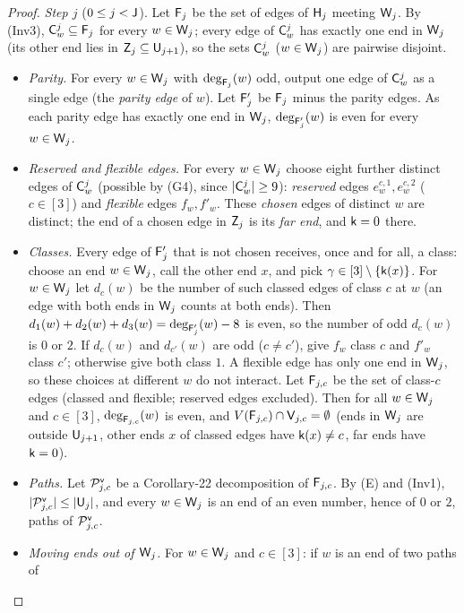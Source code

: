 \begin{proof}
\emph{Step $j$} ($0\le j<\mathsf{J}$). Let $\mathsf{F}_j$ be the set of edges of $\mathsf{H}_j$ meeting $\mathsf{W}_j$. By (Inv3),
$\mathsf{C}^j_w\subseteq\mathsf{F}_j$ for every $w\in\mathsf{W}_j$; every edge of $\mathsf{C}^j_w$ has exactly one end in $\mathsf{W}_j$ (its other end
lies in $\mathsf{Z}_j\subseteq\mathsf{U}_{j+1}$), so the sets $\mathsf{C}^j_w$ ($w\in\mathsf{W}_j$) are pairwise disjoint.
\begin{itemize}
\item[(a)] \emph{Parity.} For every $w\in\mathsf{W}_j$ with $\deg_{\mathsf{F}_j}(w)$ odd, output one edge of $\mathsf{C}^j_w$ as a single
  edge (the \emph{parity edge} of $w$). Let $\mathsf{F}'_j$ be $\mathsf{F}_j$ minus the parity edges. As each parity edge has
  exactly one end in $\mathsf{W}_j$, $\deg_{\mathsf{F}'_j}(w)$ is even for every $w\in\mathsf{W}_j$.
\item[(b)] \emph{Reserved and flexible edges.} For every $w\in\mathsf{W}_j$ choose eight further distinct edges of
  $\mathsf{C}^j_w$ (possible by (G4), since $|\mathsf{C}^j_w|\ge9$): \emph{reserved} edges $e^{c,1}_w,e^{c,2}_w$ ($c\in[3]$) and
  \emph{flexible} edges $f_w,f'_w$. These \emph{chosen} edges of distinct $w$ are distinct; the end of a chosen edge
  in $\mathsf{Z}_j$ is its \emph{far end}, and $\mathsf{k}=0$ there.
\item[(c)] \emph{Classes.} Every edge of $\mathsf{F}'_j$ that is not chosen receives, once and for all, a class: choose an
  end $w\in\mathsf{W}_j$, call the other end $x$, and pick $\gamma\in[3]\setminus\{\mathsf{k}(x)\}$. For $w\in\mathsf{W}_j$ let
  $d_c(w)$ be the number of such classed edges of class $c$ at $w$ (an edge with both ends in $\mathsf{W}_j$ counts at both
  ends). Then $d_1(w)+d_2(w)+d_3(w)=\deg_{\mathsf{F}'_j}(w)-8$ is even, so the number of odd $d_c(w)$ is $0$ or $2$. If
  $d_c(w)$ and $d_{c'}(w)$ are odd ($c\ne c'$), give $f_w$ class $c$ and $f'_w$ class $c'$; otherwise give both
  class $1$. A flexible edge has only one end in $\mathsf{W}_j$, so these choices at different $w$ do not interact. Let
  $\mathsf{F}_{j,c}$ be the set of class-$c$ edges (classed and flexible; reserved edges excluded). Then for all
  $w\in\mathsf{W}_j$ and $c\in[3]$, $\deg_{\mathsf{F}_{j,c}}(w)$ is even, and $V(\mathsf{F}_{j,c})\cap\mathsf{V}_{j,c}=\emptyset$ (ends in
  $\mathsf{W}_j$ are outside $\mathsf{U}_{j+1}$, other ends $x$ of classed edges have $\mathsf{k}(x)\ne c$, far ends have $\mathsf{k}=0$).
\item[(d)] \emph{Paths.} Let $\mathcal{P}^{\mathsf{v}}_{j,c}$ be a Corollary-22 decomposition of $\mathsf{F}_{j,c}$. By \textup{(E)} and
  (Inv1), $|\mathcal{P}^{\mathsf{v}}_{j,c}|\le|\mathsf{U}_j|$, and every $w\in\mathsf{W}_j$ is an end of an even number, hence of $0$ or $2$, paths
  of $\mathcal{P}^{\mathsf{v}}_{j,c}$.
\item[(e)] \emph{Moving ends out of $\mathsf{W}_j$.} For $w\in\mathsf{W}_j$ and $c\in[3]$: if $w$ is an end of two paths of

\end{itemize}
\end{proof}
